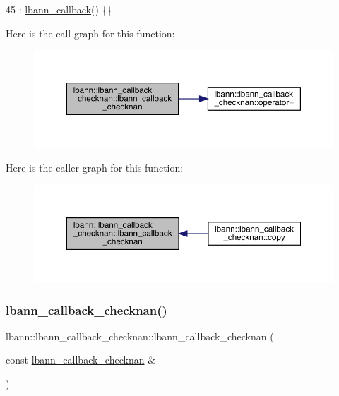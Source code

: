 \begin{DoxyCode}
45 : \hyperlink{classlbann_1_1lbann__callback_a679057298a41ddd47f08c157f756c584}{lbann\_callback}() \{\}
\end{DoxyCode}
Here is the call graph for this function\+:\nopagebreak
\begin{figure}[H]
\begin{center}
\leavevmode
\includegraphics[width=350pt]{classlbann_1_1lbann__callback__checknan_a62c093e4f67a4b387dee11fe41b5ec2f_cgraph}
\end{center}
\end{figure}
Here is the caller graph for this function\+:\nopagebreak
\begin{figure}[H]
\begin{center}
\leavevmode
\includegraphics[width=350pt]{classlbann_1_1lbann__callback__checknan_a62c093e4f67a4b387dee11fe41b5ec2f_icgraph}
\end{center}
\end{figure}
\mbox{\label{classlbann_1_1lbann__callback__checknan_a72103639c77ba3612ae174d36b279fe5}} 
\subsubsection{\texorpdfstring{lbann\+\_\+callback\+\_\+checknan()}{lbann\_callback\_checknan()}\hspace{0.1cm}{\footnotesize\ttfamily [2/2]}}
{\footnotesize\ttfamily lbann\+::lbann\+\_\+callback\+\_\+checknan\+::lbann\+\_\+callback\+\_\+checknan (\begin{DoxyParamCaption}\item[{const \hyperlink{classlbann_1_1lbann__callback__checknan}{lbann\+\_\+callback\+\_\+checknan} \&}]{ }\end{DoxyParamCaption})\hspace{0.3cm}{\ttfamily [default]}}



